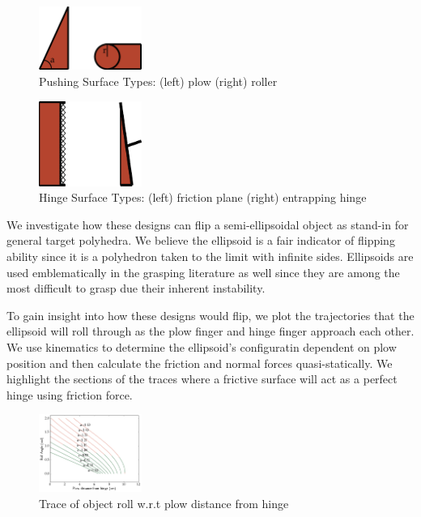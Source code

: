 \documentclass[runningheads,a4paper]{llncs}
\begin{document}
\begin{figure}[h!]
\centering
\includegraphics[width=0.3\textwidth]{PlowSurfaceTypes.eps}
\caption{\label{fig:psurfaces}Pushing Surface Types: (left) plow (right) roller}
\end{figure}

\begin{figure}[h!]
\centering
\includegraphics[width=0.3\textwidth]{HingeSurfaceTypes.eps}
\caption{\label{fig:surfacesh}Hinge Surface Types: (left) friction plane (right) entrapping hinge}
\end{figure}

We investigate how these designs can flip a semi-ellipsoidal object as stand-in for general target polyhedra.
We believe the ellipsoid is a fair indicator of flipping ability since it is a polyhedron taken to the limit with infinite sides.
Ellipsoids are used emblematically in the grasping literature as well since they are among the most difficult to grasp due their inherent instability.

To gain insight into how these designs would flip, we plot the trajectories that the ellipsoid will roll through as the plow finger and hinge finger approach each other.
We use kinematics to determine the ellipsoid's configuratin dependent on plow position and then calculate the friction and normal forces quasi-statically.
We highlight the sections of the traces where a frictive surface will act as a perfect hinge using friction force.

\begin{figure}[h!]
\centering
\includegraphics[width=0.3\textwidth]{PlowFlipTrace.png}
\caption{\label{fig:plow}Trace of object roll w.r.t plow distance from hinge}
\end{figure}
\end{document}

